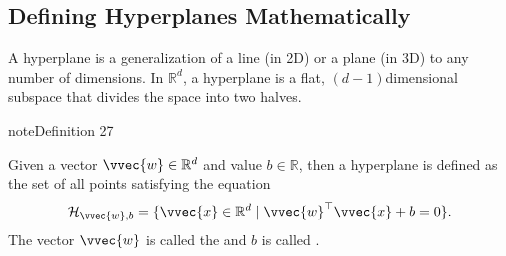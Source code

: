 \documentclass[letterpaper,10pt,english]{jupyterBook}
\begin{document}
\subsection{Defining Hyperplanes Mathematically}
\label{\detokenize{classification_svms:defining-hyperplanes-mathematically}}
\sphinxAtStartPar
A hyperplane is a generalization of a line (in 2D) or a plane (in 3D) to any number of dimensions.
In \(\mathbb{R}^d\), a hyperplane is a flat, \((d−1)\)\sphinxhyphen{}dimensional subspace that divides the space into two halves.
\label{classification_svms:definition-0}
\begin{sphinxadmonition}{note}{Definition 27}



\sphinxAtStartPar
Given a vector \(\vvec{w}\in\mathbb{R}^d\) and value \(b\in\mathbb{R}\), then
a hyperplane is defined as the set of all points satisfying the equation
\begin{equation*}
\begin{split}\mathcal{H}_{\vvec{w},b} = \{\vvec{x}\in\mathbb{R}^d\mid\vvec{w}^\top \vvec{x}+b=0\}.\end{split}
\end{equation*}
The vector \(\vvec{w}\) is called the  and \(b\) is called .
\end{sphinxadmonition}
\end{document}
